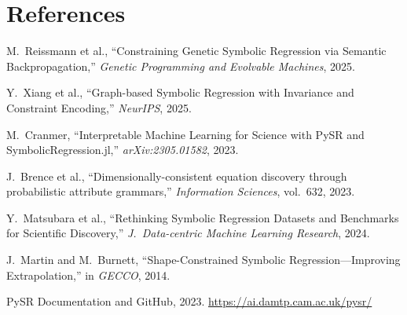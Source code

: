 \documentclass[11pt,a4paper]{article}
\begin{document}
\section*{References}

\begin{enumerate}[label={[\arabic*]},leftmargin=*]
  \item M.\ Reissmann et al., ``Constraining Genetic Symbolic Regression via Semantic Backpropagation,'' \textit{Genetic Programming and Evolvable Machines}, 2025.
  \item Y.\ Xiang et al., ``Graph-based Symbolic Regression with Invariance and Constraint Encoding,'' \textit{NeurIPS}, 2025.
  \item M.\ Cranmer, ``Interpretable Machine Learning for Science with PySR and SymbolicRegression.jl,'' \textit{arXiv:2305.01582}, 2023.
  \item J.\ Brence et al., ``Dimensionally-consistent equation discovery through probabilistic attribute grammars,'' \textit{Information Sciences}, vol.\ 632, 2023.
  \item Y.\ Matsubara et al., ``Rethinking Symbolic Regression Datasets and Benchmarks for Scientific Discovery,'' \textit{J.\ Data-centric Machine Learning Research}, 2024.
  \item J.\ Martin and M.\ Burnett, ``Shape-Constrained Symbolic Regression---Improving Extrapolation,'' in \textit{GECCO}, 2014.
  \item PySR Documentation and GitHub, 2023. \url{https://ai.damtp.cam.ac.uk/pysr/}
\end{enumerate}
\end{document}
